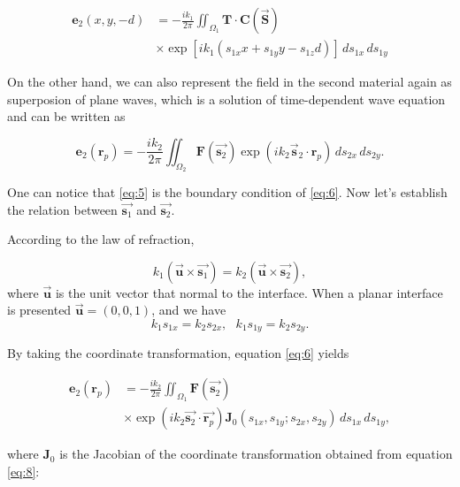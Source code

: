 \documentclass[9pt,twocolumn,twoside]{osajnl}
\begin{document}
\begin{equation}\label{eq:5}
	\begin{aligned}
		\textbf{e}_2(x,y,-d)&=-\frac{ik_1}{2\pi}\iint_{\Omega_1}\textbf{T}\cdot\textbf{C}(\vec{\textbf{S}})\\
		&\times\exp[ik_1(s_{1x}x+s_{1y}y-s_{1z}d)]\,ds_{1x}\,ds_{1y}		
	\end{aligned}
\end{equation}

On the other hand, we can also represent the field in the second material again as superposion of plane waves, which is a solution of time-dependent wave equation and can be written as

\begin{equation}\label{eq:6}
	\textbf{e}_2(\textbf{r}_p)=-\frac{ik_2}{2\pi}\iint_{\Omega_2}\textbf{F}(\vec{\mathbf{s}_2})\exp(ik_2\vec{\textbf{s}}_2\cdot\mathbf{r}_p)\,ds_{2x}\,ds_{2y}.
\end{equation}

One can notice that \eqref{eq:5} is the boundary condition of \eqref{eq:6}. Now let's establish the relation between $\vec{\textbf{s}_1}$ and $\vec{\textbf{s}_2}$.

According to the law of refraction,

\begin{equation}\label{eq:7}
	k_1(\vec{\textbf{u}}\times\vec{\textbf{s}_1})=k_2(\vec{\textbf{u}}\times\vec{\textbf{s}_2}),
\end{equation}
where $\vec{\textbf{u}}$ is the unit vector that normal to the interface. When a planar interface is presented $\vec{\textbf{u}}=(0,0,1)$, and we have
\begin{equation}\label{eq:8}
	k_1s_{1x}=k_2s_{2x},\,\,\,\,
	k_1s_{1y}=k_2s_{2y}.
\end{equation} 

By taking the coordinate transformation, equation \eqref{eq:6} yields

\begin{equation}\label{eq:9}
	\begin{aligned}
		\mathbf{e}_2(\mathbf{r}_p)&=-\frac{ik_2}{2\pi}\iint_{\Omega_1}\mathbf{F}(\vec{\mathbf{s}_2})\\
		&\times\exp(ik_2\vec{\mathbf{s}_2}\cdot\vec{\mathbf{r}_p})\mathbf{J}_0(s_{1x},s_{1y};s_{2x},s_{2y})\,ds_{1x}\,ds_{1y},		
	\end{aligned}
\end{equation}

where $\mathbf{J}_0$ is the Jacobian of the coordinate transformation obtained from equation \eqref{eq:8}:
\end{document}
